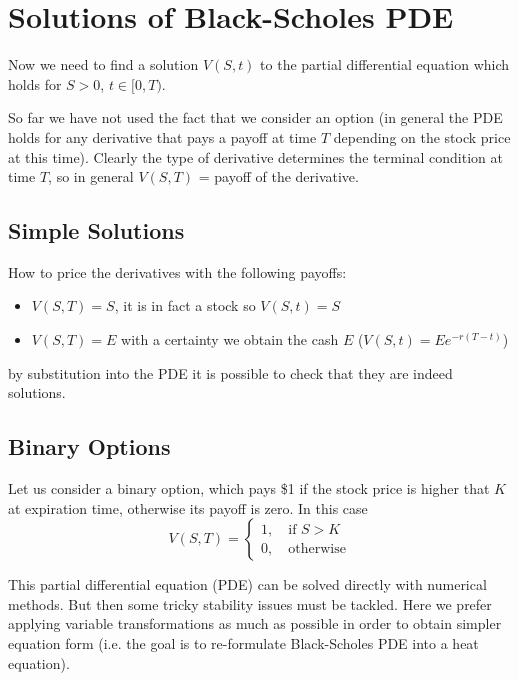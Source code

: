 \section{Solutions of Black-Scholes PDE}
Now we need to find a solution $V(S, t)$ to the partial differential equation which holds for $S >0$, $t \in [0, T)$.

So far we have not used the fact that we consider an option (in general the PDE holds for any derivative that pays a payoff at time $T$ depending on the stock price at this time).
Clearly the type of derivative determines the terminal condition at time $T$, so in general $V(S, T)$ = payoff of the derivative.

\subsection{Simple Solutions}
How to price the derivatives with the following payoffs:
\begin{itemize}
\tightlist
\item $V(S, T) = S$, it is in fact a stock so $V(S, t) = S$
\item $V(S, T) = E$ with a certainty we obtain the cash $E$ ($V(S, t) = Ee^{−r(T−t)}$)
\end{itemize}
by substitution into the PDE it is possible to check that they are indeed solutions.



\subsection{Binary Options}
Let us consider a binary option, which pays \$1 if the stock price is higher that $K$ at expiration time, otherwise its payoff is zero.
In this case
\begin{equation}
V(S, T) = 
\begin{cases}
  1, \quad\textrm{if }S > K\\
  0, \quad\textrm{otherwise}	
\end{cases}
\end{equation}

This partial differential equation (PDE) can be solved directly with numerical methods. But then some tricky stability issues must be tackled. Here we prefer applying variable transformations as much as possible in order to obtain simpler equation form (i.e. the goal is to re-formulate Black-Scholes PDE into a heat equation).

